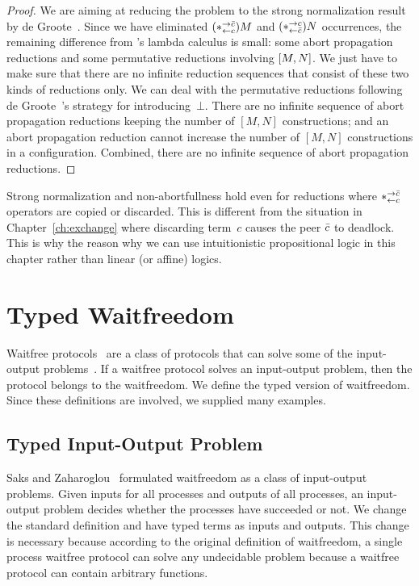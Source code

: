 \begin{proof}
We are aiming at reducing the problem to the strong normalization result
by de Groote~\cite{Philippe2002js}.
Since we have eliminated $(\ast^{\rightarrow {\bar{c}}}_{\leftarrow{c}})M$ and $(\ast^{\rightarrow {c}}_{\leftarrow{\bar{c}}})N$ occurrences,
the remaining difference from \citet{Philippe2002js}'s lambda calculus
 is small: some abort propagation reductions
 and some permutative reductions involving $[{M,N}]$.
We just have to make sure that there are no infinite reduction sequences
that consist of these two kinds of reductions only.
We can deal with the permutative reductions following de
 Groote~\cite{Philippe2002js}'s strategy for introducing~$\bot$.
 There are no infinite sequence of abort propagation reductions keeping the
 number of $[M,N]$ constructions; and an abort propagation reduction cannot increase
 the number of $[M,N]$ constructions in a configuration.  Combined,
 there are no infinite sequence of abort propagation reductions.
\end{proof}

Strong normalization and non-abortfullness hold even for reductions
where $\ast^{\rightarrow {\bar{c}}}_{\leftarrow{c}}$ operators are copied or discarded.  This is different
from the situation in Chapter~\ref{ch:exchange} where
discarding term~$c$ causes the peer $\bar{c}$ to
deadlock.  This is why the reason why we can use intuitionistic
propositional logic in this chapter rather than linear (or affine) logics.



\section{Typed Waitfreedom}
\label{waitfreedom}

Waitfree protocols~\cite{Herlihy88,Saks:1993vq} are a class of protocols
that can solve
some of the input-output problems~\cite{Moran:1987ep,Biran:1988hh}.
If a waitfree protocol solves an input-output problem, then the protocol
belongs to the waitfreedom.
We define the typed version of waitfreedom.
Since these definitions are involved, we supplied many examples.

\subsection{Typed Input-Output Problem}

Saks and Zaharoglou~\cite{Saks:1993vq} formulated waitfreedom as a class
of input-output
problems.
Given inputs for all processes and outputs of all
processes, an input-output problem decides whether the processes have
succeeded or not.
We change the standard definition and have typed terms as inputs and
outputs.
This change is necessary because according to the original definition of
waitfreedom,
a single process waitfree protocol can solve any undecidable problem
because a waitfree protocol can contain arbitrary functions.

